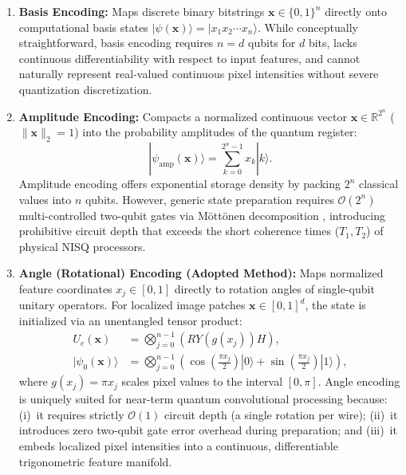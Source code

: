 \documentclass[pdflatex,sn-mathphys-num]{sn-jnl}%
\theoremstyle{thmstyleone}%
\theoremstyle{thmstyletwo}%
\theoremstyle{thmstylethree}%
\begin{document}
\begin{enumerate}
    \item \textbf{Basis Encoding:} Maps discrete binary bitstrings $\mathbf{x} \in \{0, 1\}^n$ directly onto computational basis states $|\psi(\mathbf{x})\rangle = |x_1 x_2 \cdots x_n\rangle$. While conceptually straightforward, basis encoding requires $n = d$ qubits for $d$ bits, lacks continuous differentiability with respect to input features, and cannot naturally represent real-valued continuous pixel intensities without severe quantization discretization.
    \item \textbf{Amplitude Encoding:} Compacts a normalized continuous vector $\mathbf{x} \in \mathbb{R}^{2^n}$ ($\|\mathbf{x}\|_2 = 1$) into the probability amplitudes of the quantum register:
    \begin{equation}
    |\psi_{\mathrm{amp}}(\mathbf{x})\rangle = \sum_{k=0}^{2^n - 1} x_k |k\rangle.
    \label{eq:amplitude_encoding}
    \end{equation}
    Amplitude encoding offers exponential storage density by packing $2^n$ classical values into $n$ qubits. However, generic state preparation requires $\mathcal{O}(2^n)$ multi-controlled two-qubit gates via Möttönen decomposition \cite{mottonen2004transformation}, introducing prohibitive circuit depth that exceeds the short coherence times ($T_1, T_2$) of physical NISQ processors.
    \item \textbf{Angle (Rotational) Encoding (Adopted Method):} Maps normalized feature coordinates $x_j \in [0, 1]$ directly to rotation angles of single-qubit unitary operators. For localized image patches $\mathbf{x} \in [0, 1]^d$, the state is initialized via an unentangled tensor product:
    \begin{align}
    U_e(\mathbf{x}) &= \bigotimes_{j=0}^{n-1} \left( RY(g(x_j)) H \right), \nonumber \\
    |\psi_0(\mathbf{x})\rangle &= \bigotimes_{j=0}^{n-1} \left( \cos\left(\frac{\pi x_j}{2}\right) |0\rangle + \sin\left(\frac{\pi x_j}{2}\right) |1\rangle \right),
    \label{eq:angle_encoding_exact}
    \end{align}
    where $g(x_j) = \pi x_j$ scales pixel values to the interval $[0, \pi]$. Angle encoding is uniquely suited for near-term quantum convolutional processing because: (i)~it requires strictly $\mathcal{O}(1)$ circuit depth (a single rotation per wire); (ii)~it introduces zero two-qubit gate error overhead during preparation; and (iii)~it embeds localized pixel intensities into a continuous, differentiable trigonometric feature manifold.
\end{enumerate}
\end{document}
